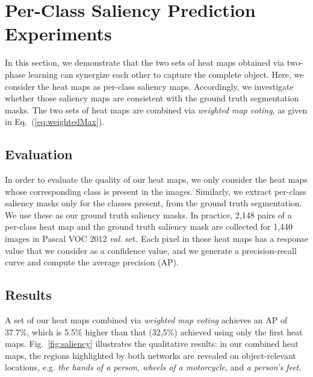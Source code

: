 \documentclass[10pt,twocolumn,letterpaper]{article}
\newcommand{\figref}[1]{Fig.~\ref{#1}}
\newcommand{\eqnref}[1]{Eq.~(\ref{#1})}
\begin{document}
\section{Per-Class Saliency Prediction Experiments}

\label{sec:saliency}
In this section, we demonstrate that the two sets of heat maps obtained via two-phase learning can synergize each other to capture the complete object. Here, we consider the heat maps as per-class saliency maps. Accordingly, we investigate whether those saliency maps are consistent with the ground truth segmentation masks. The two sets of heat maps are combined via \textit{weighted map voting}, as given in \eqnref{eq:weightedMax}.



\subsection{Evaluation}

In order to evaluate the quality of our heat maps, we only consider the heat maps whose corresponding class is present in the images. Similarly, we extract per-class saliency masks only for the classes present, from the ground truth segmentation. We use these as our ground truth saliency masks. In practice, 2,148 pairs of a per-class heat map and the ground truth saliency mask are collected for 1,440 images in Pascal VOC 2012 \textit{val.} set. Each pixel in those heat maps has a response value that we consider as a confidence value, and we generate a precision-recall curve and compute the average precision (AP).

\subsection{Results}

A set of our heat maps combined via \textit{weighted map voting} achieves an AP of 37.7\%, which is 5.5\% higher than that (32,5\%) achieved using only the first heat maps. \figref{fig:saliency} illustrates the qualitative results: in our combined heat maps, the regions highlighted by both networks are revealed on object-relevant locations, e.g. \textit{the hands of a person, wheels of a motorcycle}, and \textit{a person's feet}. %
\end{document}
